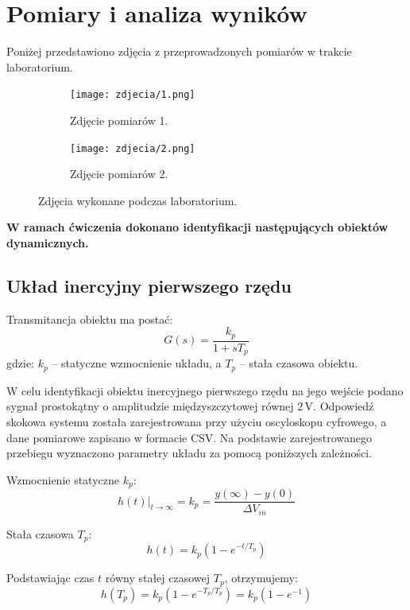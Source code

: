 \documentclass[12pt,a4paper]{article}
\begin{document}
	\newpage
	\section{Pomiary i analiza wyników}
	Poniżej przedstawiono zdjęcia z przeprowadzonych pomiarów w trakcie laboratorium.
	
	\begin{figure}[H]
		\centering
		\begin{subfigure}[b]{0.48\textwidth}
			\centering
			\texttt{[image: zdjecia/1.png]}
			\caption{Zdjęcie pomiarów 1.}
			\label{fig:pomiar1}
		\end{subfigure}
		\hfill
		\begin{subfigure}[b]{0.48\textwidth}
			\centering
			\texttt{[image: zdjecia/2.png]}
			\caption{Zdjęcie pomiarów 2.}
			\label{fig:pomiar2}
		\end{subfigure}
		\caption{Zdjęcia wykonane podczas laboratorium.}
	\end{figure}
	
	\textbf {W ramach ćwiczenia dokonano identyfikacji następujących obiektów dynamicznych.}
	
	\subsection{Układ inercyjny pierwszego rzędu}
	Transmitancja obiektu ma postać:
	\begin{equation}
		G(s) = \frac{k_p}{1 + sT_p}
	\end{equation}
	gdzie: \(k_p\) – statyczne wzmocnienie układu, a \(T_p\) – stała czasowa obiektu.
	
	W celu identyfikacji obiektu inercyjnego pierwszego rzędu na jego wejście podano sygnał prostokątny o amplitudzie międzyszczytowej równej \(2\,\text{V}\). Odpowiedź skokowa systemu została zarejestrowana przy użyciu oscyloskopu cyfrowego, a dane pomiarowe zapisano w formacie CSV. Na podstawie zarejestrowanego przebiegu wyznaczono parametry układu za pomocą poniższych zależności.
	
	Wzmocnienie statyczne \(k_p\):
	\begin{equation}
		h(t)\big|_{t \to \infty} = k_p = \frac{y(\infty) - y(0)}{\Delta V_{in}}
	\end{equation}
	
	Stała czasowa \(T_p\):
	\begin{equation}
		h(t) = k_p(1-e^{-t/T_p})
	\end{equation}
	
	Podstawiając czas $t$ równy stałej czasowej $T_p$, otrzymujemy:
	\begin{equation}
		h(T_p) = k_p(1-e^{-T_p/T_p}) = k_p(1-e^{-1})
	\end{equation}
	
\end{document}
